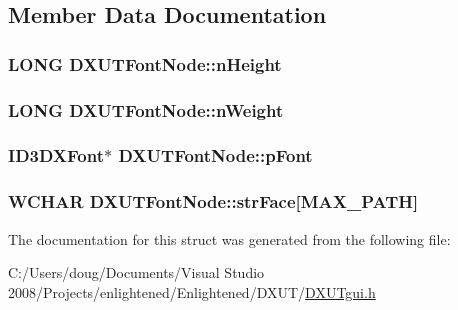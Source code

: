 \subsection{Member Data Documentation}
\hypertarget{struct_d_x_u_t_font_node_a6da65186d482f93c31e2432eed789f0f}{
\subsubsection[{nHeight}]{\setlength{\rightskip}{0pt plus 5cm}LONG {\bf DXUTFontNode::nHeight}}}
\label{struct_d_x_u_t_font_node_a6da65186d482f93c31e2432eed789f0f}
\hypertarget{struct_d_x_u_t_font_node_a7748eaafd54d1dc428c6f350d1adc725}{
\subsubsection[{nWeight}]{\setlength{\rightskip}{0pt plus 5cm}LONG {\bf DXUTFontNode::nWeight}}}
\label{struct_d_x_u_t_font_node_a7748eaafd54d1dc428c6f350d1adc725}
\hypertarget{struct_d_x_u_t_font_node_a73dd1fc4093cc67b42024a60d13a032c}{
\subsubsection[{pFont}]{\setlength{\rightskip}{0pt plus 5cm}ID3DXFont$\ast$ {\bf DXUTFontNode::pFont}}}
\label{struct_d_x_u_t_font_node_a73dd1fc4093cc67b42024a60d13a032c}
\hypertarget{struct_d_x_u_t_font_node_a38271d76ed025e34ad12db38f3cef3bf}{
\subsubsection[{strFace}]{\setlength{\rightskip}{0pt plus 5cm}WCHAR {\bf DXUTFontNode::strFace}\mbox{[}MAX\_\-PATH\mbox{]}}}
\label{struct_d_x_u_t_font_node_a38271d76ed025e34ad12db38f3cef3bf}


The documentation for this struct was generated from the following file:\begin{DoxyCompactItemize}
\item 
C:/Users/doug/Documents/Visual Studio 2008/Projects/enlightened/Enlightened/DXUT/\hyperlink{_d_x_u_tgui_8h}{DXUTgui.h}\end{DoxyCompactItemize}
